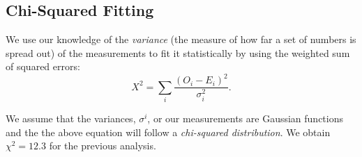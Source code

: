 \bigskip
\subsection{Chi-Squared Fitting}
We use our knowledge of the {\it variance} (the measure of how far a set of numbers is spread out) of the measurements to fit it statistically by using the weighted sum of squared errors:
$$X^2 = \sum_i \frac{(O_i-E_i)^2}{\sigma_i^2}.$$

We assume that the variances, $\sigma^i$,  or our measurements are Gaussian functions and the the above equation will follow a {\it chi-squared distribution}. We obtain $\chi^2 = 12.3$ for the previous analysis.
